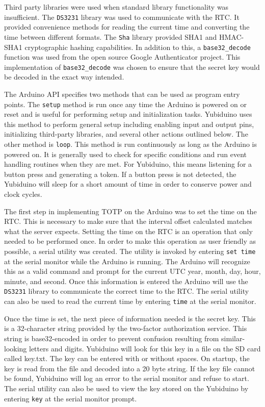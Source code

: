 \documentclass[conference]{IEEEtran}
\begin{document}
Third party libraries were used when standard library functionality was insufficient.  The \texttt{DS3231} library was used to communicate with the RTC.
It provided convenience methods for reading the current time and converting the
time between different formats.  The \texttt{Sha} library provided SHA1 and
HMAC-SHA1 cryptographic hashing capabilities.  In addition to this, a
\texttt{base32\_decode} function was used from the open source Google
Authenticator project.  This implementation of \texttt{base32\_decode} was
chosen to ensure that the secret key would be decoded in the exact way
intended.

The Arduino API specifies two methods that can be used as program entry points.
The \texttt{setup} method is run once any time the Arduino is powered on or
reset and is useful for performing setup and initialization tasks.  Yubiduino uses this method to
perform general setup including enabling input and output pins, initializing
third-party libraries, and several other actions outlined below.  The other
method is \texttt{loop}.  This method is run continuously as long as the
Arduino is powered on.  It is generally used to check for specific conditions
and run event handling routines when they are met.  For Yubiduino, this means
listening for a button press and generating a token.  If a button press is not
detected, the Yubiduino will sleep for a short amount of time in order to
conserve power and clock cycles.

The first step in implementing TOTP on the Arduino was to set the time on the
RTC.  This is necessary to make sure that the interval offset calculated
matches what the server expects.  Setting the time on the RTC is an operation
that only needed to be performed once.  In order to make this operation as user
friendly as possible, a serial utility was created.  The utility is invoked by
entering \texttt{set time} at the serial monitor while the Arduino is running.
The Arduino will recognize this as a valid command and prompt for the current
UTC year, month, day, hour, minute, and second.  Once this information is
entered the Arduino will use the \texttt{DS3231} library to communicate the
correct time to the RTC.  The serial utility can also be used to read the
current time by entering \texttt{time} at the serial monitor.

Once the time is set, the next piece of information needed is the secret key.
This is a 32-character string provided by the two-factor authorization service. This string is base32-encoded in order to prevent
confusion resulting from similar-looking letters and digits.  Yubiduino will
look for this key in a file on the SD card called key.txt.  The key can be
entered with or without spaces.  On startup, the key is read from the file and
decoded into a 20 byte string.  If the key file cannot be found, Yubiduino will
log an error to the serial monitor and refuse to start.  The serial utility can
also be used to view the key stored on the Yubiduino by entering \texttt{key}
at the serial monitor prompt.
\end{document}
